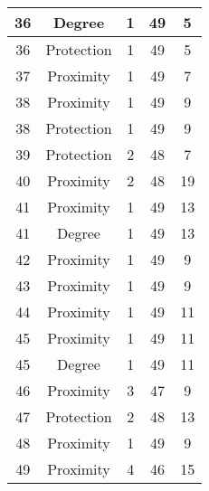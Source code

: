 \documentclass[results.tex]{subfiles}
\begin{document}
\begin{center}
\begin{tabular}{| c || c | c | c | c |}
    36 & Degree & 1 & 49 & 5 \\ 
    \hline
    36 & Protection & 1 & 49 & 5 \\ 
    \hline
    37 & Proximity & 1 & 49 & 7 \\ 
    \hline
    38 & Proximity & 1 & 49 & 9 \\ 
    \hline
    38 & Protection & 1 & 49 & 9 \\ 
    \hline
    39 & Protection & 2 & 48 & 7 \\ 
    \hline
    40 & Proximity & 2 & 48 & 19 \\ 
    \hline
    41 & Proximity & 1 & 49 & 13 \\ 
    \hline
    41 & Degree & 1 & 49 & 13 \\ 
    \hline
    42 & Proximity & 1 & 49 & 9 \\ 
    \hline
    43 & Proximity & 1 & 49 & 9 \\ 
    \hline
    44 & Proximity & 1 & 49 & 11 \\ 
    \hline
    45 & Proximity & 1 & 49 & 11 \\ 
    \hline
    45 & Degree & 1 & 49 & 11 \\ 
    \hline
    46 & Proximity & 3 & 47 & 9 \\ 
    \hline
    47 & Protection & 2 & 48 & 13 \\ 
    \hline
    48 & Proximity & 1 & 49 & 9 \\ 
    \hline
    49 & Proximity & 4 & 46 & 15 \\ 
    \hline   \end{tabular}
\end{center}
\end{document}
